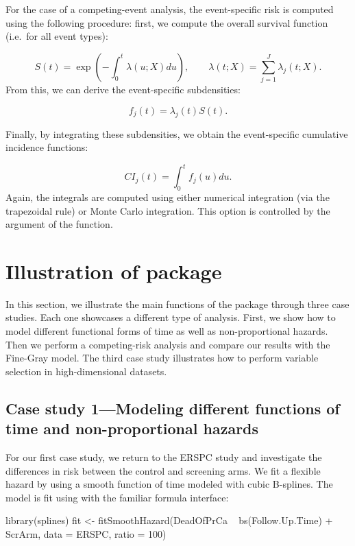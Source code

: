 For the case of a competing-event analysis, the event-specific risk is
computed using the following procedure: first, we compute the overall
survival function (i.e.~for all event types):

\[ S(t) = \exp\left(-\int_0^t \lambda(u;X) du\right),\qquad \lambda(t;X) = \sum_{j=1}^J \lambda_j(t;X).\]
From this, we can derive the event-specific subdensities:

\[ f_j(t) = \lambda_j(t)S(t).\]

Finally, by integrating these subdensities, we obtain the event-specific
cumulative incidence functions:

\[ CI_j(t) = \int_0^t f_j(u)du.\] Again, the integrals are computed
using either numerical integration (via the trapezoidal rule) or Monte
Carlo integration. This option is controlled by the argument
 of the  function.

\hypertarget{illustration-of-package}{%
\section{Illustration of package}\label{illustration-of-package}}

In this section, we illustrate the main functions of the 
package through three case studies. Each one showcases a different type
of analysis. First, we show how to model different functional forms of
time as well as non-proportional hazards. Then we perform a
competing-risk analysis and compare our results with the Fine-Gray
model. The third case study illustrates how to perform variable
selection in high-dimensional datasets.

\hypertarget{case-study-1modeling-different-functions-of-time-and-non-proportional-hazards}{%
\subsection{Case study 1---Modeling different functions of time and
non-proportional
hazards}\label{case-study-1modeling-different-functions-of-time-and-non-proportional-hazards}}

For our first case study, we return to the ERSPC study and investigate
the differences in risk between the control and screening arms. We fit a
flexible hazard by using a smooth function of time modeled with cubic
B-splines. The model is fit using  with the
familiar formula interface:

\begin{Schunk}
\begin{Sinput}
library(splines)
fit <- fitSmoothHazard(DeadOfPrCa ~ bs(Follow.Up.Time) + ScrArm, 
                       data = ERSPC, ratio = 100)
\end{Sinput}
\end{Schunk}

